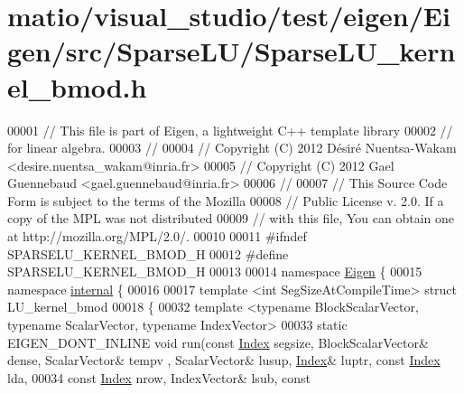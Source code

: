 \hypertarget{matio_2visual__studio_2test_2eigen_2_eigen_2src_2_sparse_l_u_2_sparse_l_u__kernel__bmod_8h_source}{}\section{matio/visual\+\_\+studio/test/eigen/\+Eigen/src/\+Sparse\+L\+U/\+Sparse\+L\+U\+\_\+kernel\+\_\+bmod.h}
\label{matio_2visual__studio_2test_2eigen_2_eigen_2src_2_sparse_l_u_2_sparse_l_u__kernel__bmod_8h_source}

\begin{DoxyCode}
00001 \textcolor{comment}{// This file is part of Eigen, a lightweight C++ template library}
00002 \textcolor{comment}{// for linear algebra.}
00003 \textcolor{comment}{//}
00004 \textcolor{comment}{// Copyright (C) 2012 Désiré Nuentsa-Wakam <desire.nuentsa\_wakam@inria.fr>}
00005 \textcolor{comment}{// Copyright (C) 2012 Gael Guennebaud <gael.guennebaud@inria.fr>}
00006 \textcolor{comment}{//}
00007 \textcolor{comment}{// This Source Code Form is subject to the terms of the Mozilla}
00008 \textcolor{comment}{// Public License v. 2.0. If a copy of the MPL was not distributed}
00009 \textcolor{comment}{// with this file, You can obtain one at http://mozilla.org/MPL/2.0/.}
00010 
00011 \textcolor{preprocessor}{#ifndef SPARSELU\_KERNEL\_BMOD\_H}
00012 \textcolor{preprocessor}{#define SPARSELU\_KERNEL\_BMOD\_H}
00013 
00014 \textcolor{keyword}{namespace }\hyperlink{namespace_eigen}{Eigen} \{
00015 \textcolor{keyword}{namespace }\hyperlink{namespaceinternal}{internal} \{
00016   
00017 \textcolor{keyword}{template} <\textcolor{keywordtype}{int} SegSizeAtCompileTime> \textcolor{keyword}{struct }LU\_kernel\_bmod
00018 \{
00032   \textcolor{keyword}{template} <\textcolor{keyword}{typename} BlockScalarVector, \textcolor{keyword}{typename} ScalarVector, \textcolor{keyword}{typename} IndexVector>
00033   \textcolor{keyword}{static} EIGEN\_DONT\_INLINE \textcolor{keywordtype}{void} run(\textcolor{keyword}{const} \hyperlink{namespace_eigen_a62e77e0933482dafde8fe197d9a2cfde}{Index} segsize, BlockScalarVector& dense, ScalarVector& tempv
      , ScalarVector& lusup, \hyperlink{namespace_eigen_a62e77e0933482dafde8fe197d9a2cfde}{Index}& luptr, \textcolor{keyword}{const} \hyperlink{namespace_eigen_a62e77e0933482dafde8fe197d9a2cfde}{Index} lda,
00034                                     \textcolor{keyword}{const} \hyperlink{namespace_eigen_a62e77e0933482dafde8fe197d9a2cfde}{Index} nrow, IndexVector& lsub, \textcolor{keyword}{const} 

\end{DoxyCode}
